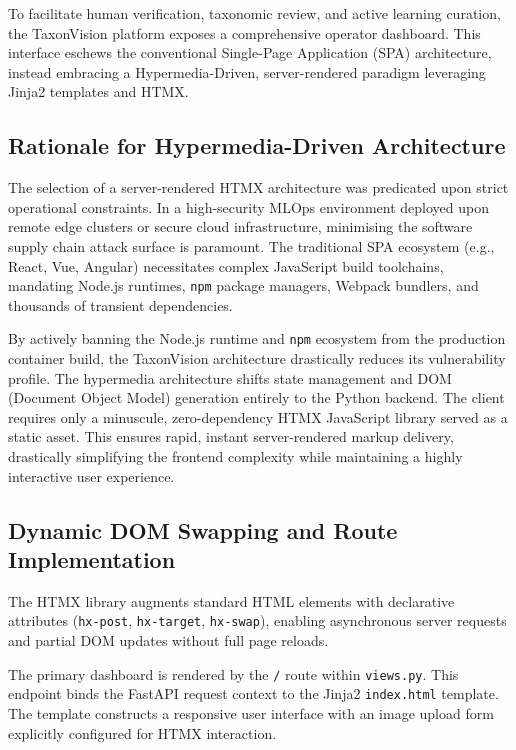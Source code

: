 

To facilitate human verification, taxonomic review, and active learning curation, the TaxonVision platform exposes a comprehensive operator dashboard. This interface eschews the conventional Single-Page Application (SPA) architecture, instead embracing a Hypermedia-Driven, server-rendered paradigm leveraging Jinja2 templates and HTMX.

\subsection{Rationale for Hypermedia-Driven Architecture}

The selection of a server-rendered HTMX architecture was predicated upon strict operational constraints. In a high-security MLOps environment deployed upon remote edge clusters or secure cloud infrastructure, minimising the software supply chain attack surface is paramount. The traditional SPA ecosystem (e.g., React, Vue, Angular) necessitates complex JavaScript build toolchains, mandating Node.js runtimes, \texttt{npm} package managers, Webpack bundlers, and thousands of transient dependencies.

By actively banning the Node.js runtime and \texttt{npm} ecosystem from the production container build, the TaxonVision architecture drastically reduces its vulnerability profile. The hypermedia architecture shifts state management and DOM (Document Object Model) generation entirely to the Python backend. The client requires only a minuscule, zero-dependency HTMX JavaScript library served as a static asset. This ensures rapid, instant server-rendered markup delivery, drastically simplifying the frontend complexity while maintaining a highly interactive user experience.

\subsection{Dynamic DOM Swapping and Route Implementation}

The HTMX library augments standard HTML elements with declarative attributes (\texttt{hx-post}, \texttt{hx-target}, \texttt{hx-swap}), enabling asynchronous server requests and partial DOM updates without full page reloads.

The primary dashboard is rendered by the \texttt{/} route within \texttt{views.py}. This endpoint binds the FastAPI request context to the Jinja2 \texttt{index.html} template. The template constructs a responsive user interface with an image upload form explicitly configured for HTMX interaction.

